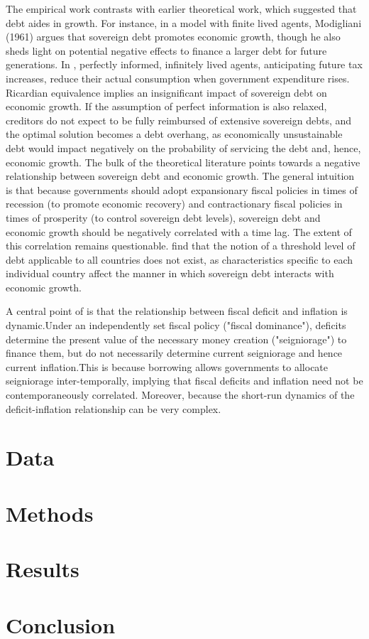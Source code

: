 \documentclass[12pt, titlepage]{article}
\numberwithin{equation}{section}
\begin{document}
The empirical work contrasts with earlier theoretical work, which suggested that debt aides in growth. For instance, in a model with finite lived agents, Modigliani (1961) argues that sovereign debt promotes economic growth, though he also sheds light on potential negative effects to finance a larger debt for future generations. In \cite{Barro74}, perfectly informed, infinitely lived agents, anticipating future tax increases, reduce their actual consumption when government expenditure rises. Ricardian equivalence implies an insignificant impact of sovereign debt on economic growth. If the assumption of perfect information is also relaxed, creditors do not expect to be fully reimbursed of extensive sovereign debts, and the optimal solution becomes a debt overhang, as economically unsustainable debt would impact negatively on the probability of servicing the debt and, hence, economic growth. The bulk of the theoretical literature points towards a negative relationship between sovereign debt and economic growth. The general intuition is that because governments should adopt expansionary fiscal policies in times of recession (to promote economic recovery) and contractionary fiscal policies in times of prosperity (to control sovereign debt levels), sovereign debt and economic growth should be negatively correlated with a time lag. The extent of this correlation remains questionable. \cite{Marchionne2015} find that the notion of a threshold level of debt applicable to all countries does not exist, as characteristics specific to each individual country affect the manner in which sovereign debt interacts with economic growth.

A central point of \cite{Sargent81} is that the relationship between fiscal
deficit and inflation is dynamic.Under an independently set fiscal policy ("fiscal dominance"), deficits determine the present value of the necessary money creation ("seigniorage") to finance them, but do not necessarily determine current seigniorage and hence current inflation.This is because borrowing allows governments to allocate seigniorage inter-temporally, implying that fiscal deficits and inflation need not be contemporaneously correlated. Moreover, because the short-run dynamics of the deficit-inflation relationship can be
very complex.

\section{Data}

\section{Methods}

\section{Results}

\section{Conclusion}


\end{document}
